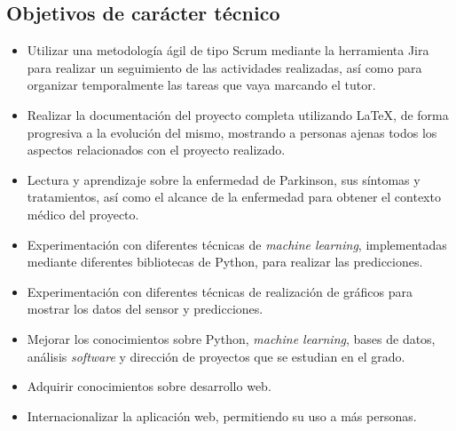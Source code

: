 \subsection{Objetivos de carácter técnico}
\begin{itemize}
    \item Utilizar una metodología ágil de tipo Scrum mediante la herramienta Jira para realizar un seguimiento de las actividades realizadas, así como para organizar temporalmente las tareas que vaya marcando el tutor.
    \item Realizar la documentación del proyecto completa utilizando \LaTeX{}, de forma progresiva a la evolución del mismo, mostrando a personas ajenas todos los aspectos relacionados con el proyecto realizado.
    \item Lectura y aprendizaje sobre la enfermedad de Parkinson, sus síntomas y tratamientos, así como el alcance de la enfermedad para obtener el contexto médico del proyecto.
    \item Experimentación con diferentes técnicas de \textit{machine learning}, implementadas mediante diferentes bibliotecas de Python, para realizar las predicciones.
    \item Experimentación con diferentes técnicas de realización de gráficos para mostrar los datos del sensor y predicciones.
    \item Mejorar los conocimientos sobre Python, \textit{machine learning}, bases de datos, análisis \textit{software} y dirección de proyectos que se estudian en el grado.
    \item Adquirir conocimientos sobre desarrollo web.
    \item Internacionalizar la aplicación web, permitiendo su uso a más personas.
\end{itemize}